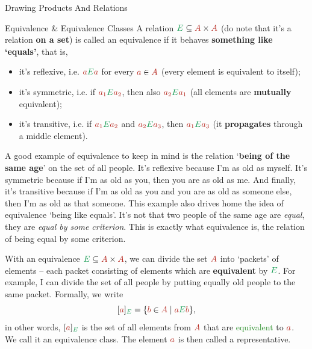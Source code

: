\documentclass[final]{beamer}
\newlength{\colwidth}
\newcommand{\clr}{\textcolor{BrickRed}}
\newcommand{\clg}{\textcolor{ForestGreen}}
\begin{document}
\begin{frame}[t]
\begin{columns}[t]
\begin{column}{\colwidth}
\begin{block}{Drawing Products And Relations}
\begin{center}
 \end{center}
\end{block}

\begin{exampleblock}{Equivalence \& Equivalence Classes}
 A relation $\clg{E} \subseteq \clr{A} \times \clr{A}$ (do note that it's a
 relation \textbf{on a set}) is called an \alert{equivalence} if it behaves
 \textbf{something like `equals'}, that is,
 \begin{itemize}[left=2em]
  \item[(R)] it's \alert{reflexive}, i.e. $\clr{a}\clg{E}\clr{a}$ for every
   $\clr{a} \in \clr{A}$ (every element is equivalent to itself);
  \item[(S)] it's \alert{symmetric}, i.e. if $\clr{a_1}\clg{E}\clr{a_2}$, then
   also $\clr{a_2}\clg{E}\clr{a_1}$ (all elements are \textbf{mutually}
   equivalent);
  \item[(T)] it's \alert{transitive}, i.e. if $\clr{a_1}\clg{E}\clr{a_2}$ and
   $\clr{a_2} \clg{E} \clr{a_3}$, then $\clr{a_1} \clg{E} \clr{a_3}$ (it
   \textbf{propagates} through a middle element).
 \end{itemize}
 A good example of equivalence to keep in mind is the relation `\textbf{being of
 the same age}' on the set of all people. It's \alert{reflexive} because I'm as
 old as myself. It's \alert{symmetric} because if I'm as old as you, then you
 are as old as me. And finally, it's \alert{transitive} because if I'm as old as
 you and you are as old as someone else, then I'm as old as that someone. This
 example also drives home the idea of equivalence `being like equals'. It's not
 that two people of the same age are \emph{equal}, they are \emph{equal by some
 criterion}. This is exactly what equivalence is, the relation of being equal by
 some criterion.

 With an equivalence $\clg{E} \subseteq \clr{A} \times \clr{A}$, we can divide
 the set $\clr{A}$ into `packets' of elements -- each packet consisting of
 elements which are \textbf{equivalent} by $\clg{E}$. For example, I can divide
 the set of all people by putting equally old people to the same packet.
 Formally, we write
 \[
  [\clr{a}]_{\clg{E}} = \{\clr{b} \in \clr{A} \mid \clr{a}\clg{E}\clr{b}\},
 \]
 in other words, $[\clr{a}]_{\clg{E}}$ is the set of all elements from $\clr{A}$
 that are \clg{equivalent} to $\clr{a}$. We call it \alert{an equivalence
 class}. The element $\clr{a}$ is then called a \alert{representative}.


\end{exampleblock}
\end{column}
\end{columns}
\end{frame}
\end{document}
